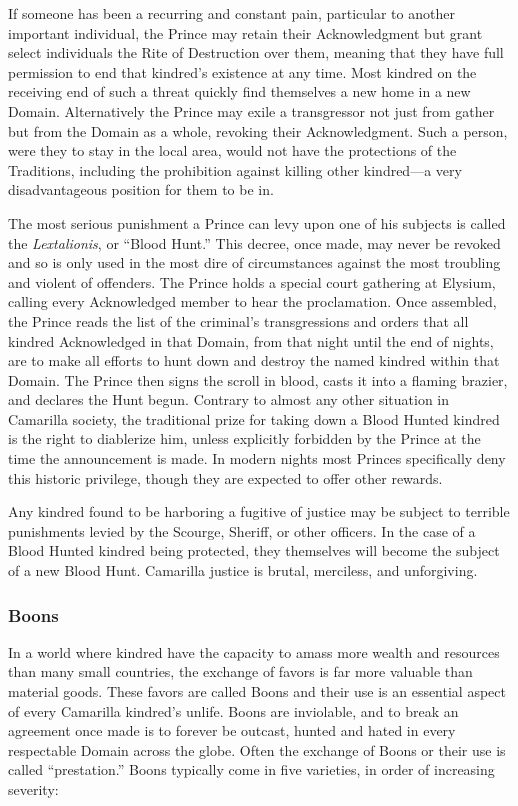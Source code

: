 If someone has been a recurring and constant pain, particular to another important 
individual, the Prince may retain their Acknowledgment but grant select individuals 
the Rite of Destruction over them, meaning that they have full permission to end that 
kindred's existence at any time.  Most kindred on the receiving end of such a 
threat quickly find themselves a new home in a new Domain.  Alternatively the 
Prince may exile a transgressor not just from gather but from the Domain as a whole, 
revoking their Acknowledgment.  Such a person, were they to stay in the local area, 
would not have the protections of the Traditions, including the prohibition against 
killing other kindred---a very disadvantageous position for them to be in.

The most serious punishment a Prince can levy upon one of his subjects is called the 
\emph{Lextalionis}, or ``Blood Hunt.''  This decree, once made, may never be revoked 
and so is only used in the most dire of circumstances against the most troubling and 
violent of offenders.  The Prince holds a special court gathering at Elysium, calling 
every Acknowledged member to hear the proclamation.  Once assembled, the Prince reads 
the list of the criminal's transgressions and orders that all kindred Acknowledged 
in that Domain, from that night until the end of nights, are to make all efforts to hunt 
down and destroy the named kindred within that Domain.  The Prince then signs the scroll 
in blood, casts it into a flaming brazier, and declares the Hunt begun.  Contrary to 
almost any other situation in Camarilla society, the traditional prize for taking down a 
Blood Hunted kindred is the right to diablerize him, unless explicitly forbidden by the 
Prince at the time the announcement is made.  In modern nights most Princes specifically 
deny this historic privilege, though they are expected to offer other rewards.

Any kindred found to be harboring a fugitive of justice may be subject to terrible 
punishments levied by the Scourge, Sheriff, or other officers.  In the case of a 
Blood Hunted kindred being protected, they themselves will become the subject of a 
new Blood Hunt.  Camarilla justice is brutal, merciless, and unforgiving.

\subsubsection{Boons}
In a world where kindred have the capacity to amass more wealth and resources than 
many small countries, the exchange of favors is far more valuable than material goods.  
These favors are called Boons and their use is an essential aspect of every Camarilla 
kindred's unlife.  Boons are inviolable, and to break an agreement once made is to 
forever be outcast, hunted and hated in every respectable Domain across the globe.  Often 
the exchange of Boons or their use is called ``prestation.''  Boons typically come in five 
varieties, in order of increasing severity:

